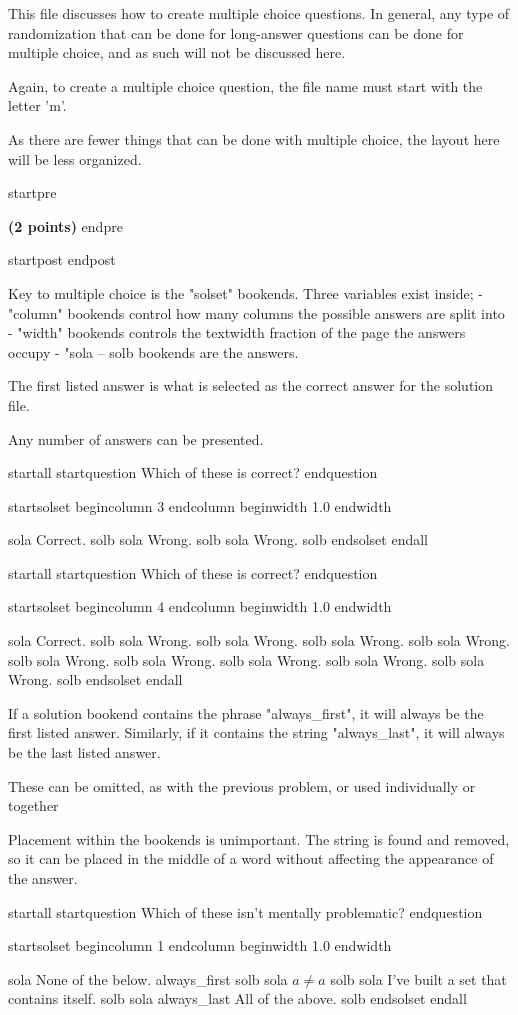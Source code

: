 This file discusses how to create multiple choice questions. In general, any type of randomization that can be done for long-answer questions can be done for multiple choice, and as such will not be discussed here.

Again, to create a multiple choice question, the file name must start with the letter 'm'.


As there are fewer things that can be done with multiple choice, the layout here will be less organized.



startpre
\item {\bf (2 points)} 
endpre

startpost
endpost



Key to multiple choice is the "solset" bookends. Three variables exist inside;
-  "column" bookends control how many columns the possible answers are split into
-  "width" bookends controls the textwidth fraction of the page the answers occupy
-  "sola -- solb bookends are the answers.

The first listed answer is what is selected as the correct answer for the solution file.

Any number of answers can be presented.


startall
startquestion Which of these is correct?
endquestion

startsolset
begincolumn 3 endcolumn
beginwidth 1.0 endwidth

sola Correct. solb
sola Wrong. solb
sola Wrong. solb
endsolset
endall




startall
startquestion Which of these is correct?
endquestion

startsolset
begincolumn 4 endcolumn
beginwidth 1.0 endwidth

sola Correct. solb
sola Wrong. solb
sola Wrong. solb
sola Wrong. solb
sola Wrong. solb
sola Wrong. solb
sola Wrong. solb
sola Wrong. solb
sola Wrong. solb
sola Wrong. solb
endsolset
endall



If a solution bookend contains the phrase "always_first", it will always be the first listed answer. Similarly, if it contains the string "always_last", it will always be the last listed answer.

These can be omitted, as with the previous problem, or used individually or together

Placement within the bookends is unimportant. The string is found and removed, so it can be placed in the middle of a word without affecting the appearance of the answer.

startall
startquestion Which of these isn't mentally problematic?
endquestion

startsolset
begincolumn 1 endcolumn
beginwidth 1.0 endwidth

sola None of the below. always_first solb
sola $a \neq a$ solb
sola I've built a set that contains itself. solb
sola always_last All of the above. solb
endsolset
endall

